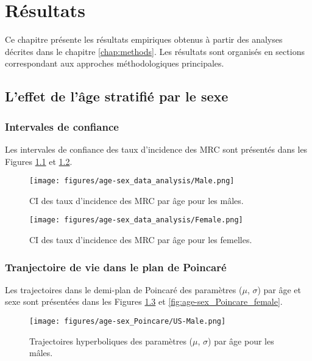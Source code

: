 \chapter{Résultats}
\label{chap:results}

Ce chapitre présente les résultats empiriques obtenus à partir des analyses décrites dans le chapitre \ref{chap:methods}. Les résultats sont organisés en sections correspondant aux approches méthodologiques principales.

\section{L'effet de l'âge stratifié par le sexe}

\subsection{Intervales de confiance}

Les intervales de confiance des taux d'incidence des MRC sont présentés dans les Figures \ref{fig:CI-age-sex-males} et \ref{fig:CI-age-sex-females}.

\begin{figure}[H]
	\centering
	\texttt{[image: figures/age-sex\_data\_analysis/Male.png]}
	\caption{CI des taux d'incidence des MRC par âge pour les mâles.}
	\label{fig:CI-age-sex-males}
\end{figure}

\begin{figure}[H]
	\centering
	\texttt{[image: figures/age-sex\_data\_analysis/Female.png]}
	\caption{CI des taux d'incidence des MRC par âge pour les femelles.}
	\label{fig:CI-age-sex-females}
\end{figure}

\subsection{Tranjectoire de vie dans le plan de Poincaré}

Les trajectoires dans le demi-plan de Poincaré des paramètres ($\mu$, $\sigma$) par âge et sexe sont présentées dans les Figures  \ref{fig:age-sex_Poincare_male} et  \ref{fig:age-sex_Poincare_female}.

\begin{figure}[H]
\centering
\texttt{[image: figures/age-sex\_Poincare/US-Male.png]}
\caption{Trajectoires hyperboliques des paramètres ($\mu$, $\sigma$) par âge pour les mâles.}
\label{fig:age-sex_Poincare_male}
\end{figure}

